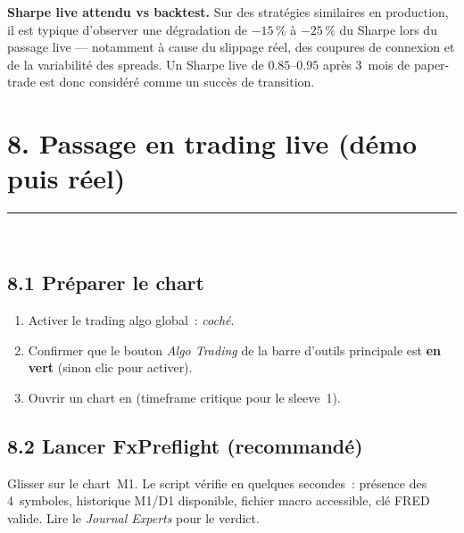 \documentclass[11pt, a4paper]{scrartcl}
\begin{document}
\begin{insightbox}
\textbf{Sharpe live attendu vs backtest.} Sur des stratégies similaires en
production, il est typique d'observer une dégradation de $-15\,\%$ à
$-25\,\%$ du Sharpe lors du passage live --- notamment à cause du slippage
réel, des coupures de connexion et de la variabilité des spreads. Un
Sharpe live de $0.85$--$0.95$ après 3~mois de paper-trade est donc
considéré comme un succès de transition.
\end{insightbox}


\section*{8. Passage en trading live (démo puis réel)}
\label{sec:deployment}
\vspace{-0.4em}
{\color{accent}\rule{\linewidth}{1.0pt}}\\[0.4em]

\subsection*{8.1 Préparer le chart}

\begin{enumerate}
\item Activer le trading algo global~:  \emph{coché}.
\item Confirmer que le bouton \emph{Algo Trading} de la barre d'outils
principale est \textbf{en vert} (sinon clic pour activer).
\item Ouvrir un chart  en  (timeframe critique
pour le sleeve~1).
\end{enumerate}

\subsection*{8.2 Lancer FxPreflight (recommandé)}

Glisser 
sur le chart~M1. Le script vérifie en quelques secondes~: présence des
4~symboles, historique M1/D1 disponible, fichier macro accessible, clé FRED
valide. Lire le \emph{Journal Experts} pour le verdict.
\end{document}
